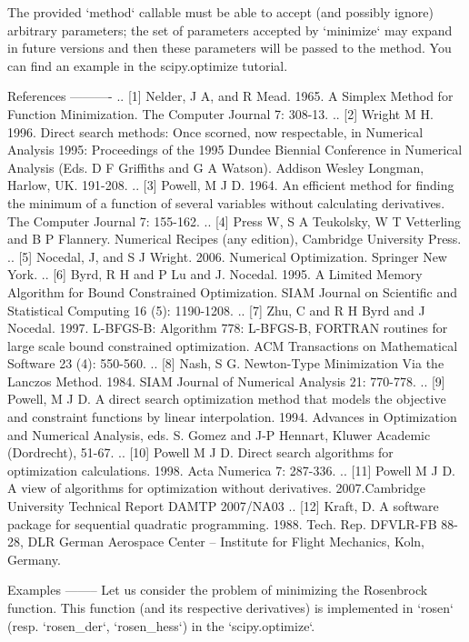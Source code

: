 \begin{DoxyVerb}
The provided `method` callable must be able to accept (and possibly ignore)
arbitrary parameters; the set of parameters accepted by `minimize` may
expand in future versions and then these parameters will be passed to
the method.  You can find an example in the scipy.optimize tutorial.

References
----------
.. [1] Nelder, J A, and R Mead. 1965. A Simplex Method for Function
    Minimization. The Computer Journal 7: 308-13.
.. [2] Wright M H. 1996. Direct search methods: Once scorned, now
    respectable, in Numerical Analysis 1995: Proceedings of the 1995
    Dundee Biennial Conference in Numerical Analysis (Eds. D F
    Griffiths and G A Watson). Addison Wesley Longman, Harlow, UK.
    191-208.
.. [3] Powell, M J D. 1964. An efficient method for finding the minimum of
   a function of several variables without calculating derivatives. The
   Computer Journal 7: 155-162.
.. [4] Press W, S A Teukolsky, W T Vetterling and B P Flannery.
   Numerical Recipes (any edition), Cambridge University Press.
.. [5] Nocedal, J, and S J Wright. 2006. Numerical Optimization.
   Springer New York.
.. [6] Byrd, R H and P Lu and J. Nocedal. 1995. A Limited Memory
   Algorithm for Bound Constrained Optimization. SIAM Journal on
   Scientific and Statistical Computing 16 (5): 1190-1208.
.. [7] Zhu, C and R H Byrd and J Nocedal. 1997. L-BFGS-B: Algorithm
   778: L-BFGS-B, FORTRAN routines for large scale bound constrained
   optimization. ACM Transactions on Mathematical Software 23 (4):
   550-560.
.. [8] Nash, S G. Newton-Type Minimization Via the Lanczos Method.
   1984. SIAM Journal of Numerical Analysis 21: 770-778.
.. [9] Powell, M J D. A direct search optimization method that models
   the objective and constraint functions by linear interpolation.
   1994. Advances in Optimization and Numerical Analysis, eds. S. Gomez
   and J-P Hennart, Kluwer Academic (Dordrecht), 51-67.
.. [10] Powell M J D. Direct search algorithms for optimization
   calculations. 1998. Acta Numerica 7: 287-336.
.. [11] Powell M J D. A view of algorithms for optimization without
   derivatives. 2007.Cambridge University Technical Report DAMTP
   2007/NA03
.. [12] Kraft, D. A software package for sequential quadratic
   programming. 1988. Tech. Rep. DFVLR-FB 88-28, DLR German Aerospace
   Center -- Institute for Flight Mechanics, Koln, Germany.

Examples
--------
Let us consider the problem of minimizing the Rosenbrock function. This
function (and its respective derivatives) is implemented in `rosen`
(resp. `rosen_der`, `rosen_hess`) in the `scipy.optimize`.


\end{DoxyVerb}
